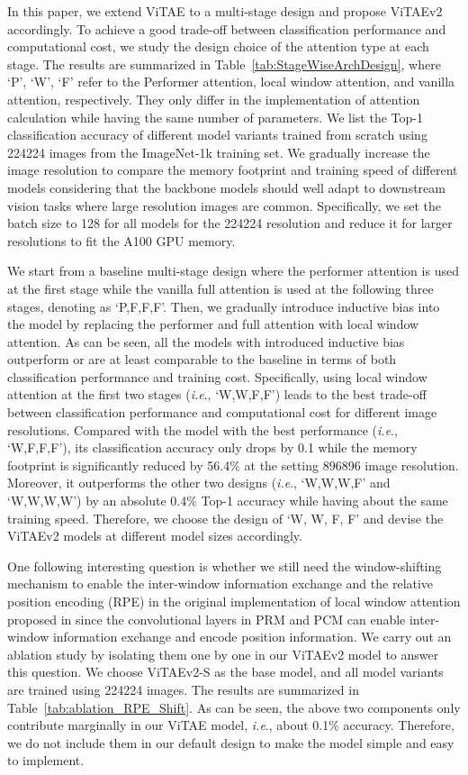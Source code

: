 \documentclass[twocolumn]{svjour3}          \smartqed  \usepackage{natbib}
\newcommand{\ie}{i.e}
\def\onedot{.\xspace}
\def\ie{\emph{i.e}\onedot}
\begin{document}
In this paper, we extend ViTAE to a multi-stage design and propose ViTAEv2 accordingly. To achieve a good trade-off between classification performance and computational cost, we study the design choice of the attention type at each stage. The results are summarized in Table~\ref{tab:StageWiseArchDesign}, where `P', `W', `F' refer to the Performer attention, local window attention, and vanilla attention, respectively. They only differ in the implementation of attention calculation while having the same number of parameters. We list the Top-1 classification accuracy of different model variants trained from scratch using 224224 images from the ImageNet-1k training set. We gradually increase the image resolution to compare the memory footprint and training speed of different models considering that the backbone models should well adapt to downstream vision tasks where large resolution images are common. Specifically, we set the batch size to 128 for all models for the 224224 resolution and reduce it for larger resolutions to fit the A100 GPU memory. 

We start from a baseline multi-stage design where the performer attention is used at the first stage while the vanilla full attention is used at the following three stages, denoting as `P,F,F,F'. Then, we gradually introduce inductive bias into the model by replacing the performer and full attention with local window attention. As can be seen, all the models with introduced inductive bias outperform or are at least comparable to the baseline in terms of both classification performance and training cost. Specifically, using local window attention at the first two stages (\ie, `W,W,F,F') leads to the best trade-off between classification performance and computational cost for different image resolutions. Compared with the model with the best performance (\ie, `W,F,F,F'), its classification accuracy only drops by 0.1 while the memory footprint is significantly reduced by 56.4\% at the setting 896896 image resolution. Moreover, it outperforms the other two designs (\ie, `W,W,W,F' and `W,W,W,W') by an absolute 0.4\% Top-1 accuracy while having about the same training speed. Therefore, we choose the design of `W, W, F, F' and devise the ViTAEv2 models at different model sizes accordingly.

One following interesting question is whether we still need the window-shifting mechanism to enable the inter-window information exchange and the relative position encoding (RPE) in the original implementation of local window attention proposed in \citep{liu2021swin} since the convolutional layers in PRM and PCM can enable inter-window information exchange and encode position information. We carry out an ablation study by isolating them one by one in our ViTAEv2 model to answer this question. We choose ViTAEv2-S as the base model, and all model variants are trained using 224224 images. The results are summarized in Table~\ref{tab:ablation_RPE_Shift}. As can be seen, the above two components only contribute marginally in our ViTAE model, \ie, about 0.1\% accuracy. Therefore, we do not include them in our default design to make the model simple and easy to implement. 
\end{document}
